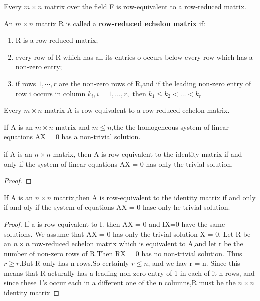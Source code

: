 \begin{theorem}
	Every $m \times n$ matrix over the field F is row-equivalent to a row-reduced matrix.
\end{theorem}

\begin{definition}
	An $m \times n$ matrix R is called a \textbf{row-reduced echelon matrix} if:
	\begin{enumerate}
		\item R is a row-reduced matrix;
		\item every row of R which has all its entries o occurs below every row which has a non-zero entry;
		\item if rows $1,\cdots ,r$ are the non-zero rows of R,and if the leading non-zero entry of row i occurs in column $k_i, i = 1,\dots,r,$ then $k_1 \leq k_2 <\dots<k_r$

	\end{enumerate}

\end{definition}

\begin{theorem}
	Every $m \times n$ matrix A is row-equivalent to a row-reduced echelon matrix.
\end{theorem}
\newpage
\begin{theorem}
	If A is an $m \times n$ matrix and $m \leq n$,the the homogeneous system of linear equations AX = 0 has a non-trivial solution.
\end{theorem}




\begin{theorem}
	if A is an $n \times n$ matrix, then A is row-equivalent to the identity matrix if and only if the system of linear equations AX = 0 has only the trivial solution.
\end{theorem}

\begin{proof}

\end{proof}



\begin{theorem}
	If A is an $n \times n$ matrix,then A is row-equivalent to the identity matrix if and only if and oly if the system of equations AX = 0 hase only he trivial solution.
	\label{thm:row_equivalent_to_identity_matrix}
\end{theorem}

\begin{proof}
	If a is row-equivalent to I. then AX = 0 and IX=0 have the same solutions.
	We assume that AX = 0 has only the trivial solution X = 0. Let R be an $n \times n$
	row-reduced echelon matrix  which is equivalent to A,and let r be the number of non-zero rows of R.Then RX = 0 has no non-trivial solution. Thus $r \geq r$.But R only has n rows.So certainly $r \leq n$, and we hav r = n. Since this means that R acturally has a leading non-zero entry of 1 in each of it n rows, and since these 1's occur each in a different one of the n columns,R must be the $n \times n$ identity matrix
\end{proof}


